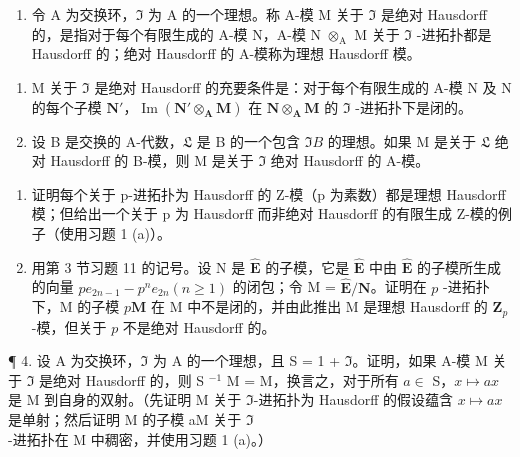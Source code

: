 
\begin{enumerate}
\def\labelenumi{\arabic{enumi}.}
\tightlist
\item
令 A 为交换环，\(\mathfrak{I}\) 为 A 的一个理想。称 A-模 M 关于 \(\mathfrak{I}\) 是绝对 Hausdorff 的，是指对于每个有限生成的 A-模 N，A-模 N \(\otimes_{\mathrm{A}}\) M 关于 \(\mathfrak{I}\) -进拓扑都是 Hausdorff 的；绝对 Hausdorff 的 A-模称为理想 Hausdorff 模。
\end{enumerate}

\begin{enumerate}
\def\labelenumi{(\alph{enumi})}
\item
M 关于 \(\mathfrak{I}\) 是绝对 Hausdorff 的充要条件是：对于每个有限生成的 A-模 N 及 N 的每个子模 \(\mathbf{N}'\)，\(\operatorname{Im}(\mathbf{N}' \otimes_{\mathbf{A}} \mathbf{M})\) 在 \(\mathbf{N} \otimes_{\mathbf{A}} \mathbf{M}\) 的 \(\mathfrak{I}\) -进拓扑下是闭的。
\item
  设 B 是交换的 A-代数，\(\mathfrak{L}\) 是 B 的一个包含 \(\mathfrak{I}B\) 的理想。如果 M 是关于 \(\mathfrak{L}\) 绝对 Hausdorff 的 B-模，则 M 是关于 \(\mathfrak{I}\) 绝对 Hausdorff 的 A-模。
\end{enumerate}

\begin{enumerate}
\def\labelenumi{\arabic{enumi}.}
\setcounter{enumi}{1}
\item
  证明每个关于 p-进拓扑为 Hausdorff 的 Z-模（p 为素数）都是理想 Hausdorff 模；但给出一个关于 p 为 Hausdorff 而非绝对 Hausdorff 的有限生成 Z-模的例子（使用习题 1 (a)）。
\item
用第 3 节习题 11 的记号。设 N 是 \(\hat{\mathbf{E}}\) 的子模，它是 \(\hat{\mathbf{E}}\) 中由 \(\hat{\mathbf{E}}\) 的子模所生成的向量 \(pe_{2n-1} - p^n e_{2n} (n \geqslant 1)\) 的闭包；令 M = \(\hat{\mathbf{E}}/\mathbf{N}\)。证明在 \(p\) -进拓扑下，M 的子模 \(p\mathbf{M}\) 在 M 中不是闭的，并由此推出 M 是理想 Hausdorff 的 \(\mathbf{Z}_p\)-模，但关于 \(p\) 不是绝对 Hausdorff 的。
\end{enumerate}

¶ 4. 设 A 为交换环，\(\mathfrak{I}\) 为 A 的一个理想，且 S = 1 + \(\mathfrak{I}\)。证明，如果 A-模 M 关于 \(\mathfrak{I}\) 是绝对 Hausdorff 的，则 S \(^{-1}\) M = M，换言之，对于所有 \(a \in\) S，\(x \mapsto ax\) 是 M 到自身的双射。（先证明 M 关于 \(\mathfrak{I}\)-进拓扑为 Hausdorff 的假设蕴含 \(x \mapsto ax\) 是单射；然后证明 M 的子模 aM 关于 \(\mathfrak{I}\)-进拓扑在 M 中稠密，并使用习题 1 (a)。）

